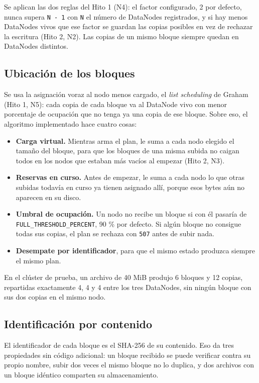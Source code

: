 \documentclass[10pt]{article}
\begin{document}
Se aplican las dos reglas del Hito 1 (N4): el factor configurado, 2 por defecto, nunca supera \texttt{N - 1} con \texttt{N} el número de DataNodes registrados, y si hay menos DataNodes vivos que ese factor se guardan las copias posibles en vez de rechazar la escritura (Hito 2, N2). Las copias de un mismo bloque siempre quedan en DataNodes distintos.

\subsection{Ubicación de los bloques}

Se usa la asignación voraz al nodo menos cargado, el \emph{list scheduling} de Graham (Hito 1, N5): cada copia de cada bloque va al DataNode vivo con menor porcentaje de ocupación que no tenga ya una copia de ese bloque. Sobre eso, el algoritmo implementado hace cuatro cosas:

\begin{itemize}
\item \textbf{Carga virtual.} Mientras arma el plan, le suma a cada nodo elegido el tamaño del bloque, para que los bloques de una misma subida no caigan todos en los nodos que estaban más vacíos al empezar (Hito 2, N3).
\item \textbf{Reservas en curso.} Antes de empezar, le suma a cada nodo lo que otras subidas todavía en curso ya tienen asignado allí, porque esos bytes aún no aparecen en su disco.
\item \textbf{Umbral de ocupación.} Un nodo no recibe un bloque si con él pasaría de \texttt{FULL\_THRESHOLD\_PERCENT}, 90 \% por defecto. Si algún bloque no consigue todas sus copias, el plan se rechaza con \texttt{507} antes de subir nada.
\item \textbf{Desempate por identificador}, para que el mismo estado produzca siempre el mismo plan.
\end{itemize}

En el clúster de prueba, un archivo de 40 MiB produjo 6 bloques y 12 copias, repartidas exactamente 4, 4 y 4 entre los tres DataNodes, sin ningún bloque con sus dos copias en el mismo nodo.

\subsection{Identificación por contenido}

El identificador de cada bloque es el SHA-256 de su contenido. Eso da tres propiedades sin código adicional: un bloque recibido se puede verificar contra su propio nombre, subir dos veces el mismo bloque no lo duplica, y dos archivos con un bloque idéntico comparten su almacenamiento.
\end{document}
